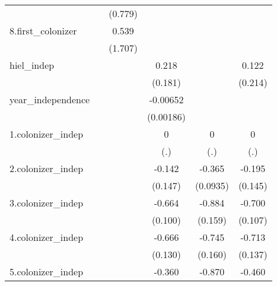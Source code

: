 {\begin{tabular}{l*{5}{c}}
            &                     &     (0.779)         &                     &                     &                     \\
[1em]
8.first\_colonizer&                     &       0.539         &                     &                     &                     \\
            &                     &     (1.707)         &                     &                     &                     \\
[1em]
hiel\_indep  &                     &                     &       0.218         &                     &       0.122         \\
            &                     &                     &     (0.181)         &                     &     (0.214)         \\
[1em]
year\_independence&                     &                     &    -0.00652\sym{**} &                     &                     \\
            &                     &                     &   (0.00186)         &                     &                     \\
[1em]
1.colonizer\_indep&                     &                     &           0         &           0         &           0         \\
            &                     &                     &         (.)         &         (.)         &         (.)         \\
[1em]
2.colonizer\_indep&                     &                     &      -0.142         &      -0.365\sym{**} &      -0.195         \\
            &                     &                     &     (0.147)         &    (0.0935)         &     (0.145)         \\
[1em]
3.colonizer\_indep&                     &                     &      -0.664\sym{***}&      -0.884\sym{***}&      -0.700\sym{***}\\
            &                     &                     &     (0.100)         &     (0.159)         &     (0.107)         \\
[1em]
4.colonizer\_indep&                     &                     &      -0.666\sym{***}&      -0.745\sym{***}&      -0.713\sym{***}\\
            &                     &                     &     (0.130)         &     (0.160)         &     (0.137)         \\
[1em]
5.colonizer\_indep&                     &                     &      -0.360         &      -0.870\sym{***}&      -0.460         \\

\end{tabular}}
